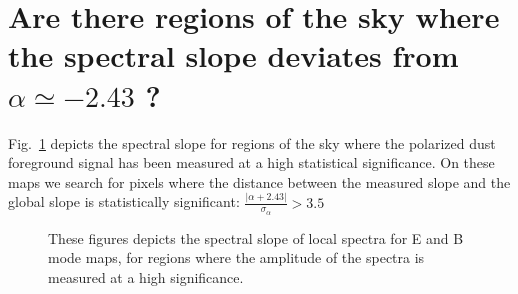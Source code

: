 \documentclass[12pt]{article}
\begin{document}
\begin{figure}[!h]
 \hspace{-0.2cm}
 \hspace{-0.2cm}
\caption{}
\end{figure}

\section{Are there regions of the sky where the spectral slope deviates from $\alpha \simeq-2.43$ ? }
Fig.~\ref{fig:eb_slope} depicts the spectral slope for regions of the sky where the polarized dust foreground signal has been measured at a high statistical significance. On these maps we search for pixels where the distance between the measured slope and the global slope is statistically significant: $\frac{|\alpha + 2.43|}{\sigma_{\alpha}} > 3.5$ 
\begin{figure}[!h]
\centering
{}
\caption{These figures depicts the spectral slope of local spectra for E and B mode maps, for regions where the amplitude of the spectra is measured at a high significance.}
\label{fig:eb_slope}
\end{figure}
\end{document}
